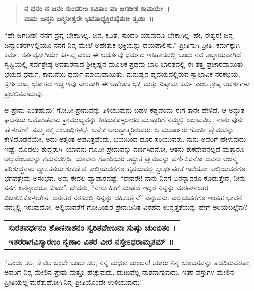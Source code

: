\begin{verse}
\textbf{ನ ಧನಂ ನ ಜನಂ ಸುಂದರೀಂ ಕವಿತಾಂ ವಾ ಜಗದೀಶ ಕಾಮಯೇ~।}\\\textbf{ಮಮ ಜನ್ಮನಿ ಜನ್ಮನೀಶ್ವರೇ ಭವತಾದ್ಭಕ್ತಿರಹೈತುಕೀ ತ್ವಯಿ~॥}
\end{verse}

“ಹೇ ಜಗದೀಶ! ನನಗೆ ದ್ರವ್ಯ ಬೇಕಾಗಿಲ್ಲ. ಜನ, ಕವಿತೆ, ಸುಂದರಿ ಯಾವುದೂ ಬೇಕಾಗಿಲ್ಲ, ಹೇ, ಈಶ್ವರ! ಜನ್ಮ ಜನ್ಮಾಂತರಗಳಲ್ಲಿಯೂ ನನಗೆ ನಿನ್ನ ಮೇಲೆ ಅಹೇತುಕ ಭಕ್ತಿಯನ್ನು ದಯಪಾಲಿಸು.” ಪ್ರೀತಿಗಾಗಿ ಪ್ರೀತಿ, ಕರ್ಮಕ್ಕಾಗಿ ಕರ್ಮ, ಕರ್ತವ್ಯಕ್ಕಾಗಿಯೇ ಕರ್ತವ್ಯ ಎಂಬ ಈ ಆದರ್ಶವು ಧರ್ಮದ ಇತಿಹಾಸದಲ್ಲಿ ಒಂದು ನವ ಅಧ್ಯಾಯವಾಗಿದೆ. ಸೃಷ್ಟಿಯಲ್ಲಿ ಸರ್ವಶ್ರೇಷ್ಠ ಅವತಾರನಾದ ಶ‍್ರೀಕೃಷ್ಣನ ಮೂಲಕ ಪ್ರಥಮ ಬಾರಿ ಭಾರತದಲ್ಲಿ ಈ ತತ್ತ್ವ ಪ್ರಚಾರವಾಯಿತು. ಭಯದ ಧರ್ಮ, ಕಾಮನೆಯ ಧರ್ಮ ಮಾಯವಾಯಿತು. ಮನುಷ್ಯನ ಹೃದಯದಲ್ಲಿರುವ ಸ್ವಾಭಾವಿಕ ನರಕಭಯ, ಸ್ವರ್ಗಸುಖ, ಭೋಗದ ಇಚ್ಛೆ ಇವು ನಾಶವಾಗಿ ಈ ಅಹೇತುಕ ಭಕ್ತಿ ಮತ್ತು ನಿಷ್ಕಾಮ ಕರ್ಮ ಎಂಬ ಶ್ರೇಷ್ಠ ಆದರ್ಶಗಳು ಪ್ರಚಲಿತವಾದುವು.

ಆ ಪ್ರೇಮ ಎಂತಹುದು! ಗೋಪೀ ಪ್ರೇಮವನ್ನು ತಿಳಿಯುವುದು ಬಹಳ ಕಷ್ಟವೆಂದು ಈಗ ತಾನೇ ಹೇಳಿದೆ. ಆ ಅದ್ಭುತ ಘಟನೆಯ ಅಮೋಘವಾದ ಪ್ರಾಮುಖ್ಯವನ್ನು ತಿಳಿದುಕೊಳ್ಳಲಾರದ ಮೂಢರಿಗೆ ನಮ್ಮಲ್ಲಿ ಅಭಾವವಿಲ್ಲ. ನಾನು ಪುನಃ ಹೇಳುತ್ತೇನೆ, ನಮ್ಮ ರಕ್ತ ಸಂಬಂಧಿಗಳಲ್ಲೇ ಅನೇಕ ಅಶುದ್ಧಾತ್ಮರಿರುವರು. ಆ ಮೂರ್ಖರು ಗೋಪೀ ಪ್ರೇಮವನ್ನು ಕೇಳಿದೊಡನೆಯೇ, ಅದು ಅತ್ಯಂತ ಅಪವಿತ್ರವೆಂದು, ಭಯದಿಂದ ದೂರ ಸರಿಯುವರು. ನಾನು ಅವರಿಗೆ ಹೇಳುವುದು ಇಷ್ಟೆ: ಮೊದಲು ಶುದ್ಧರಾಗಿ. ಯಾವನು ಗೊಪೀ ಪ್ರೇಮವನ್ನು ವರ್ಣಿಸಿದನೋ, ಆತನು ಶುಕದೇವನಲ್ಲದೆ ಮತ್ತಾರೂ ಅಲ್ಲವೆಂಬುದನ್ನು ಗಮನದಲ್ಲಿಡಿ. ಯಾವನು ಗೋಪಿಯರ ಅದ್ಭುತ ಪ್ರೇಮವನ್ನು ವರ್ಣಿಸಿದನೋ ಅವನು ಆಜನ್ಮ ಪರಿಶುದ್ಧನಾದ ವ್ಯಾಸತನಯ ಶುಕದೇವ. ಎಲ್ಲಿಯವರೆಗೂ ಹೃದಯದಲ್ಲಿ ಸ್ವಾರ್ಥಪರತೆ ಇದೆಯೋ, ಅಲ್ಲಿಯವರೆಗೂ ಭಗವತ್ಪ್ರೇಮ ಅಸಂಭವ. ಅದು ಕೇವಲ ವ್ಯಾಪಾರವಷ್ಟೆ. “ದೇವರೇ! ನಾನು ನಿನಗೆ ಏನನ್ನಾದರೂ ಕೊಡುತ್ತೇನೆ, ನೀನು ನನಗೆ ಏನನ್ನಾದರೂ ಕೊಡು”. ದೇವರು, “ನೀನು ಹೀಗೆ ಮಾಡದೆ ಇದ್ದರೆ ನಿನ್ನನ್ನು ಮರಣಾನಂತರ ವಿಚಾರಿಸಿಕೊಳ್ಳುತ್ತೇನೆ. ಅನಂತರ ನರಕದಲ್ಲಿ ನಿನ್ನನ್ನು ದಹಿಸುತ್ತೇನೆ” ಎನ್ನುವನು. ಎಲ್ಲಿಯವರೆಗೂ ಇಂತಹ ಭಾವನೆ ನಮ್ಮಲ್ಲಿ ಇರುವುದೋ, ಅಲ್ಲಿಯವರೆಗೆ ಗೋಪಿಯರ ಪ್ರೇಮಜನಿತ ವಿರಹದ ಉನ್ಮತ್ತತೆಯನ್ನು ಹೇಗೆ ಅರಿಯಬಲ್ಲೆವು?

\begin{longtable}{@{}l@{}}
\textbf{ಸುರತವರ್ಧನಂ ಶೋಕನಾಶನಂ ಸ್ವರಿತವೇಣುನಾ ಸುಷ್ಠು ಚುಂಬಿತಂ ।} \\
\textbf{ಇತರರಾಗವಿಸ್ಮಾರಣಂ ನೃಣಾಂ ವಿತರ ವೀರ ನಸ್ತೇಽಧರಾಮೃತಮ್​ ॥} \\
\end{longtable}

“ಒಂದು ಸಲ, ಕೇವಲ ಒಂದೇ ಒಂದು ಸಲ, ನಿನ್ನ ಮಧುರ ಚುಂಬನ! ಯಾರು ನಿನ್ನ ಚುಂಬನವನ್ನು ಪಡೆದಿರುವರೋ, ಅವರಿಗೆ ನಿನ್ನ ಮೇಲಿನ ಪ್ರೇಮ ಮತ್ತೂ ಹೆಚ್ಚುವುದು. ದುಃಖವೆಲ್ಲ ನಾಶವಾಗುವುದು. ಇತರ ವಸ್ತುಗಳ ಮೇಲಿನ ಪ್ರೀತಿಯೆಲ್ಲ ಮರೆತುಹೋಗಿ ನಿನ್ನ ಪ್ರೀತಿಯೊಂದೇ ಉಳಿಯುವುದು”.

